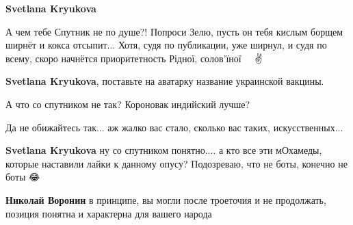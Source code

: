 \begin{itemize}
\begin{itemize}
\textbf{Svetlana Kryukova} 

А чем тебе Спутник не по душе?! Попроси Зелю, пусть он тебя кислым борщем ширнёт
и кокса отсыпит... Хотя, судя по публикации, уже ширнул, и судя по всему, скоро
начнётся приоритетность Рідної, солов'їної🤣🤣🤣🤣🤣✌️

 
\textbf{Svetlana Kryukova}, поставьте на аватарку название украинской вакцины.

 
А что со спутником не так? Короновак индийский лучше?

 
Да не обижайтесь так... аж жалко вас стало, сколько вас таких, искусственных...

 
\textbf{Svetlana Kryukova} ну со спутником понятно.... а кто все эти мОхамеды, которые наставили лайки к данному опусу? Подозреваю, что не боты, конечно не боты 😂

 
\textbf{Николай Воронин} в принципе, вы могли после троеточия и не продолжать, позиция понятна и характерна для вашего народа

 

\end{itemize}
\end{itemize}
